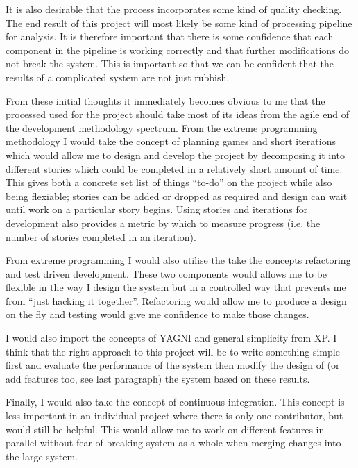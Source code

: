 \documentclass[paper=a4, fontsize=11pt]{scrartcl}	%
\numberwithin{equation}{section} %
\numberwithin{figure}{section} %
\numberwithin{table}{section}
\begin{document}
It is also desirable that the process incorporates some kind of quality checking. The end result of this project will most likely be some kind of processing pipeline for analysis. It is therefore important that there is some confidence that each component in the pipeline is working correctly and that further modifications do not break the system. This is important so that we can be confident that the results of a complicated system are not just rubbish.

From these initial thoughts it immediately becomes obvious to me that the processed used for the project should take most of its ideas from the agile end of the development methodology spectrum. From the extreme programming methodology I would take the concept of planning games and short iterations which would allow me to design and develop the project by decomposing it into different stories which could be completed in a relatively short amount of time. This gives both a concrete set list of things ``to-do'' on the project while also being flexiable; stories can be added or dropped as required and design can wait until work on a particular story begins. Using stories and iterations for development also provides a metric by which to measure progress (i.e. the number of stories completed in an iteration).

From extreme programming I would also utilise the take the concepts refactoring and test driven development. These two components would allows me to be flexible in the way I design the system but in a controlled way that prevents me from ``just hacking it together''. Refactoring would allow me to produce a design on the fly and testing would give me confidence to make those changes.

I would also import the concepts of YAGNI and general simplicity from XP. I think that the right approach to this project will be to write something simple first and evaluate the performance of the system then modify the design of (or add features too, see last paragraph) the system based on these results.

Finally, I would also take the concept of continuous integration. This concept is less important in an individual project where there is only one contributor, but would still be helpful. This would allow me to work on different features in parallel without fear of breaking system as a whole when merging changes into the large system.
\end{document}
